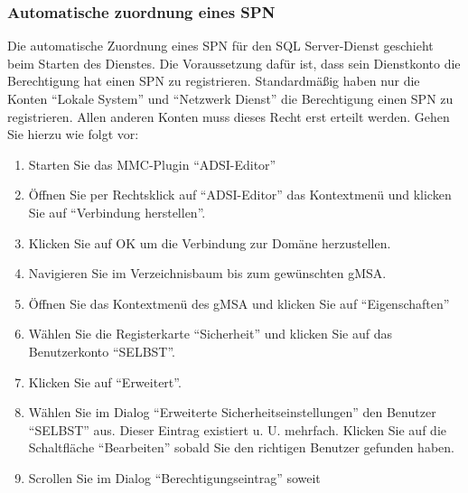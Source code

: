        \subsubsection{Automatische zuordnung eines SPN}
          Die automatische Zuordnung eines SPN für den SQL Server-Dienst geschieht
          beim Starten des Dienstes. Die Voraussetzung dafür ist, dass sein
          Dienstkonto die Berechtigung hat einen SPN zu registrieren.
          Standardmäßig haben nur die Konten \enquote{Lokale System} und
          \enquote{Netzwerk Dienst} die Berechtigung einen SPN zu registrieren.
          Allen anderen Konten muss dieses Recht erst erteilt werden. Gehen Sie
          hierzu wie folgt vor:
          \begin{enumerate}
            \item Starten Sie das MMC-Plugin \enquote{ADSI-Editor}
            \item Öffnen Sie per Rechtsklick auf \enquote{ADSI-Editor} das
            Kontextmenü und klicken Sie auf \enquote{Verbindung herstellen}.
            \item Klicken Sie auf OK um die Verbindung zur Domäne herzustellen.
            \item Navigieren Sie im Verzeichnisbaum bis zum gewünschten gMSA.
            \item Öffnen Sie das Kontextmenü des gMSA und klicken Sie auf
            \enquote{Eigenschaften}
            \item Wählen Sie die Registerkarte \enquote{Sicherheit} und klicken
            Sie auf das Benutzerkonto \enquote{SELBST}.
            \item Klicken Sie auf \enquote{Erweitert}.
            \item Wählen Sie im Dialog \enquote{Erweiterte
            Sicherheitseinstellungen} den Benutzer \enquote{SELBST} aus. Dieser
            Eintrag existiert u. U. mehrfach. Klicken Sie auf die Schaltfläche
            \enquote{Bearbeiten} sobald Sie den richtigen Benutzer gefunden
            haben.
            \item Scrollen Sie im Dialog \enquote{Berechtigungseintrag} soweit

\end{enumerate}

